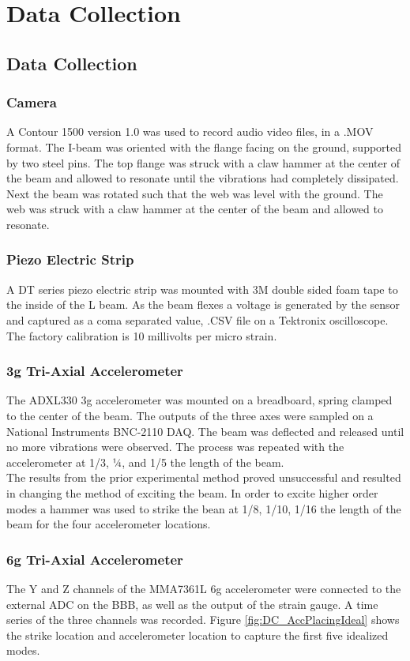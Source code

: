 
\chapter{Data Collection}
\section{Data Collection}
\subsection{Camera}
\indent A Contour 1500 version 1.0 was used to record audio video files, in a .MOV format. The I-beam was oriented with the flange facing on the ground, supported by two steel pins. The top flange was struck with a claw hammer at the center of the beam and allowed to resonate until the vibrations had completely dissipated. Next the beam was rotated such that the web was level with the ground. The web was struck with a claw hammer at the center of the beam and allowed to resonate. 

\subsection{Piezo Electric Strip}
\indent A DT series piezo electric strip was mounted with 3M double sided foam tape to the inside of the L beam.  As the beam flexes a voltage is generated by the sensor and captured as a coma separated value, .CSV file on a Tektronix oscilloscope. The factory calibration is 10 millivolts per micro strain. 

\subsection{3g Tri-Axial Accelerometer}
\indent The ADXL330 3g accelerometer was mounted on a breadboard, spring clamped to the center of the beam. The outputs of the three axes were sampled on a National Instruments BNC-2110 DAQ. The beam was deflected and released until no more vibrations were observed. The process was repeated with the accelerometer at 1/3, ¼, and 1/5 the length of the beam.\\
\indent The results from the prior experimental method proved unsuccessful and resulted in changing the method of exciting the beam. In order to excite higher order modes a hammer was used to strike the bean at 1/8, 1/10, 1/16 the length of the beam for the four accelerometer locations.

\subsection{6g Tri-Axial Accelerometer}
\indent The Y and Z channels of the MMA7361L 6g accelerometer were connected to the external ADC on the BBB, as well as the output of the strain gauge. A time series of the three channels was recorded. Figure \ref{fig:DC_AccPlacingIdeal} shows the strike location and accelerometer location to capture the first five idealized modes.

